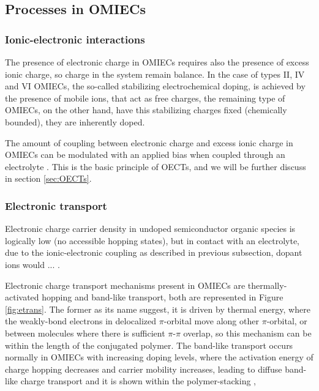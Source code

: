 \subsection{Processes in OMIECs}

\subsubsection{Ionic-electronic interactions}
The presence of electronic charge in OMIECs requires also the presence of excess ionic charge, so charge in the system remain balance. In the case of types II, IV and VI OMIECs, the so-called stabilizing electrochemical doping, is achieved by the presence of mobile ions, that act as free charges, the remaining type of OMIECs, on the other hand, have this stabilizing charges fixed (chemically bounded), they are inherently doped.


The amount of coupling between electronic charge and excess ionic charge in OMIECs can be modulated with an applied bias when coupled through an electrolyte \cite{paulsenOrganicMixedIonic2020}. This is the basic principle of OECTs, and we will be further discuss in section \ref{sec:OECTs}.

\subsubsection{Electronic transport}
Electronic charge carrier density in undoped semiconductor organic species is logically low (no accessible hopping states), but in contact with an electrolyte, due to the ionic-electronic coupling as described in previous subsection, dopant ions would ... \cite{paulsenOrganicMixedIonic2020}. 

Electronic charge transport mechanisms present in OMIECs are thermally-activated hopping and band-like transport, both are represented in Figure \ref{fig:etrans}. The former as its name suggest, it is driven by thermal energy, where the weakly-bond electrons in delocalized $\pi$-orbital move along other $\pi$-orbital, or between molecules where there is sufficient $\pi$-$\pi$ overlap, so this mechanism can be within the length of the conjugated polymer. The band-like transport occurs normally in OMIECs with increasing doping levels, where the activation energy of charge hopping decreases and carrier mobility increases, leading to diffuse band-like charge transport and it is shown within the polymer-stacking ,


